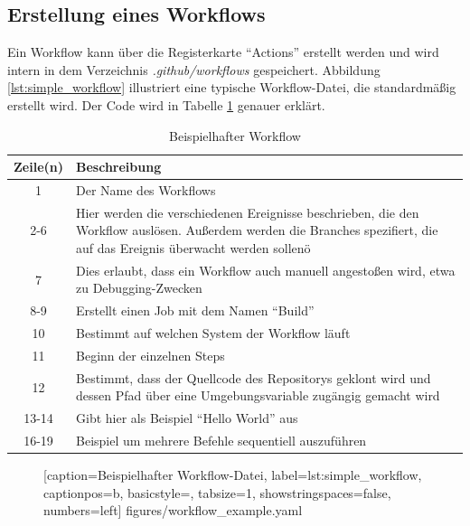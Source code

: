 \subsection{Erstellung eines Workflows}
Ein Workflow kann über die Registerkarte \enquote{Actions} erstellt werden und wird intern in dem Verzeichnis \textit{.github/workflows} gespeichert. Abbildung \ref{lst:simple_workflow} illustriert eine typische Workflow-Datei, die standardmäßig erstellt wird. Der Code wird in Tabelle \ref{tab:descr_example_workflow} genauer erklärt.
\clearpage
\begin{table}[h!]
    \centering
    \begin{tabular}{c|m{10cm}}
        Zeile(n) &  Beschreibung \\\hline
         1 & Der Name des Workflows\\\hline
         2-6 & Hier werden die verschiedenen Ereignisse beschrieben, die den Workflow auslösen. Außerdem werden die Branches spezifiert, die auf das Ereignis überwacht werden sollenö\\\hline
         7 &  Dies erlaubt, dass ein Workflow auch manuell angestoßen wird, etwa zu Debugging-Zwecken\\\hline
         8-9 & Erstellt einen Job mit dem Namen \enquote{Build}\\\hline
         10 & Bestimmt auf welchen System der Workflow läuft\\\hline
         11 & Beginn der einzelnen Steps\\\hline
         12 & Bestimmt, dass der Quellcode des Repositorys geklont wird und dessen Pfad über eine Umgebungsvariable zugängig gemacht wird\\\hline
         13-14 & Gibt hier als Beispiel \enquote{Hello World} aus\\\hline
         16-19 &Beispiel um mehrere Befehle sequentiell auszuführen\\\hline
         
    \end{tabular}
    \caption{Beispielhafter Workflow}
    \label{tab:descr_example_workflow}
\end{table}
		\begin{figure}[h!]
			
			[caption={Beispielhafter Workflow-Datei},
			label={lst:simple_workflow},
			captionpos=b, basicstyle=\footnotesize, tabsize=1, showstringspaces=false,  numbers=left]
			{figures/workflow_example.yaml}
		\end{figure}
	\clearpage
